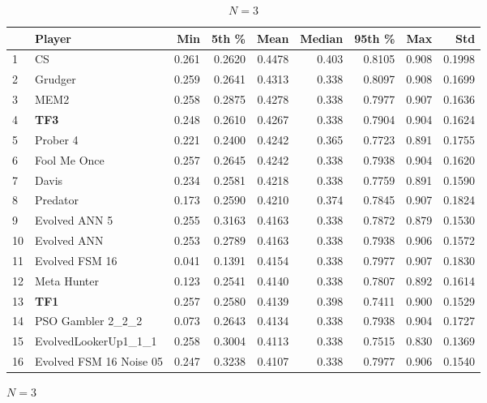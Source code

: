 \documentclass[10pt,letterpaper]{article}
\begin{document}
\begin{table}[!hbtp]
    \centering
    \tiny
    \begin{subfigure}[t]{\columnwidth}
        \centering
            \begin{tabular}{llrrrrrrr}
            \toprule
            {} &                   Player &    Min &   5th \% &    Mean &  Median &  95th \% &    Max &     Std \\
            \midrule
            1  &                       CS &  0.261 &  0.2620 &  0.4478 &   0.403 &  0.8105 &  0.908 &  0.1998 \\
            2  &                  Grudger &  0.259 &  0.2641 &  0.4313 &   0.338 &  0.8097 &  0.908 &  0.1699 \\
            3  &                     MEM2 &  0.258 &  0.2875 &  0.4278 &   0.338 &  0.7977 &  0.907 &  0.1636 \\
            4  &                      \textbf{TF3} &  0.248 &  0.2610 &  0.4267 &   0.338 &  0.7904 &  0.904 &  0.1624 \\
            5  &                 Prober 4 &  0.221 &  0.2400 &  0.4242 &   0.365 &  0.7723 &  0.891 &  0.1755 \\
            6  &             Fool Me Once &  0.257 &  0.2645 &  0.4242 &   0.338 &  0.7938 &  0.904 &  0.1620 \\
            7  &                    Davis &  0.234 &  0.2581 &  0.4218 &   0.338 &  0.7759 &  0.891 &  0.1590 \\
            8  &                 Predator &  0.173 &  0.2590 &  0.4210 &   0.374 &  0.7845 &  0.907 &  0.1824 \\
            9  &            Evolved ANN 5 &  0.255 &  0.3163 &  0.4163 &   0.338 &  0.7872 &  0.879 &  0.1530 \\
            10 &              Evolved ANN &  0.253 &  0.2789 &  0.4163 &   0.338 &  0.7938 &  0.906 &  0.1572 \\
            11 &           Evolved FSM 16 &  0.041 &  0.1391 &  0.4154 &   0.338 &  0.7977 &  0.907 &  0.1830 \\
            12 &              Meta Hunter &  0.123 &  0.2541 &  0.4140 &   0.338 &  0.7807 &  0.892 &  0.1614 \\
            13 &                      \textbf{TF1} &  0.257 &  0.2580 &  0.4139 &   0.398 &  0.7411 &  0.900 &  0.1529 \\
            14 &        PSO Gambler 2\_2\_2 &  0.073 &  0.2643 &  0.4134 &   0.338 &  0.7938 &  0.904 &  0.1727 \\
            15 &     EvolvedLookerUp1\_1\_1 &  0.258 &  0.3004 &  0.4113 &   0.338 &  0.7515 &  0.830 &  0.1369 \\
            16 &  Evolved FSM 16 Noise 05 &  0.247 &  0.3238 &  0.4107 &   0.338 &  0.7977 &  0.906 &  0.1540 \\
            \bottomrule
            \end{tabular}
        \caption{\(N=3\)}
    \end{subfigure}%


\end{table}
\end{document}
